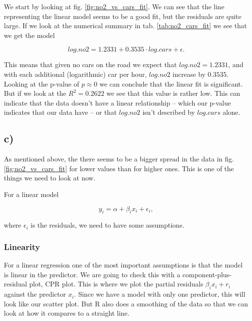 \documentclass[a4paper,norsk, 10pt]{article}
\begin{document}
We start by looking at fig. \ref{fig:no2_vs_cars_fit}. We can see that the line representing the linear model seems to be a good fit, but the residuals are quite large. If we look at the numerical summary in tab. \ref{tab:no2_cars_fit} we see that we get the model

\begin{equation}
log.no2 = 1.2331 + 0.3535\cdot log.cars + \epsilon.
\end{equation}

This means that given no cars on the road we expect that $log.no2 = 1.2331$, and with each additional (logarithmic) car per hour, $log.no2$ increase by $0.3535$. Looking at the p-value of $p \approx 0$ we can conclude that the linear fit is significant. But if we look at the $R^2 = 0.2622$ we see that this value is rather low. This can indicate that the data doesn't have a linear relationship -- which our p-value indicates that our data have -- or that $log.no2$ isn't described by $log.cars$ alone.


\subsection*{c)}
As mentioned above, the there seems to be a bigger spread in the data in fig. \ref{fig:no2_vs_cars_fit} for lower values than for higher ones. This is one of the things we need to look at now. 

For a linear model

\begin{equation}
y_i = \alpha + \beta_i x_i + \epsilon_i,
\end{equation}

where $\epsilon_i$ is the residuals, we need to have some assumptions.


\subsubsection*{Linearity}
For a linear regression one of the most important assumptions is that the model is linear in the predictor. We are going to check this with a  component-plus-residual plot, CPR plot. This is where we plot the partial residuals $\beta_i x_i + r_i$ against the predictor $x_i$. Since we have a model with only one predictor, this will look like our scatter plot. But R also does a smoothing of the data so that we can look at how it compares to a straight line.
\end{document}
